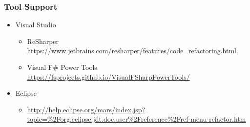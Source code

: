 \begin{frame}

\frametitle{Tool Support}

\begin{itemize}

\item Visual Studio

\begin{itemize}

\item ReSharper \url{https://www.jetbrains.com/resharper/features/code_refactoring.html}.

\item Visual F\# Power Tools
\url{https://fsprojects.github.io/VisualFSharpPowerTools/}

\end{itemize}

\item Eclipse

\begin{itemize}

\item
\url{http://help.eclipse.org/mars/index.jsp?topic=\%2Forg.eclipse.jdt.doc.user\%2Freference\%2Fref-menu-refactor.htm}

\end{itemize}

\end{itemize}

\end{frame}
